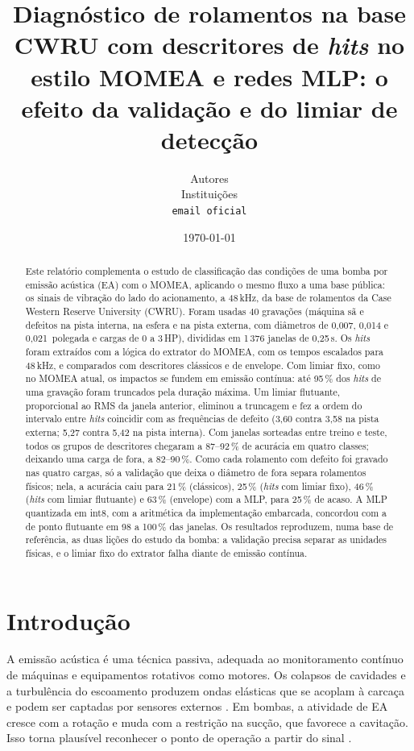 \documentclass[12pt]{article}
\title{\textbf{Diagnóstico de rolamentos na base CWRU com descritores de \textit{hits} no estilo MOMEA e redes MLP: o efeito da validação e do limiar de detecção}}
\date{\today}
\author{Autores \\ Instituições \\ \texttt{email oficial}}
\begin{document}
\maketitle

\begin{abstract}
Este relatório complementa o estudo de classificação das condições de uma bomba por emissão acústica (EA) com o MOMEA, aplicando o mesmo fluxo a uma base pública: os sinais de vibração do lado do acionamento, a 48\,kHz, da base de rolamentos da Case Western Reserve University (CWRU). Foram usadas 40 gravações (máquina sã e defeitos na pista interna, na esfera e na pista externa, com diâmetros de 0,007, 0,014 e 0,021~polegada e cargas de 0 a 3\,HP), divididas em 1\,376 janelas de 0,25\,s. Os \textit{hits} foram extraídos com a lógica do extrator do MOMEA, com os tempos escalados para 48\,kHz, e comparados com descritores clássicos e de envelope. Com limiar fixo, como no MOMEA atual, os impactos se fundem em emissão contínua: até 95\,\% dos \textit{hits} de uma gravação foram truncados pela duração máxima. Um limiar flutuante, proporcional ao RMS da janela anterior, eliminou a truncagem e fez a ordem do intervalo entre \textit{hits} coincidir com as frequências de defeito (3,60 contra 3,58 na pista externa; 5,27 contra 5,42 na pista interna). Com janelas sorteadas entre treino e teste, todos os grupos de descritores chegaram a 87--92\,\% de acurácia em quatro classes; deixando uma carga de fora, a 82--90\,\%. Como cada rolamento com defeito foi gravado nas quatro cargas, só a validação que deixa o diâmetro de fora separa rolamentos físicos; nela, a acurácia caiu para 21\,\% (clássicos), 25\,\% (\textit{hits} com limiar fixo), 46\,\% (\textit{hits} com limiar flutuante) e 63\,\% (envelope) com a MLP, para 25\,\% de acaso. A MLP quantizada em int8, com a aritmética da implementação embarcada, concordou com a de ponto flutuante em 98 a 100\,\% das janelas. Os resultados reproduzem, numa base de referência, as duas lições do estudo da bomba: a validação precisa separar as unidades físicas, e o limiar fixo do extrator falha diante de emissão contínua.
\end{abstract}

\section{Introdução}

A emissão acústica é uma técnica passiva, adequada ao monitoramento contínuo de máquinas e equipamentos rotativos como motores. Os colapsos de cavidades e a turbulência do escoamento produzem ondas elásticas que se acoplam à carcaça e podem ser captadas por sensores externos \cite{brennen1995,neill1997,alfayez2005}. Em bombas, a atividade de EA cresce com a rotação e muda com a restrição na sucção, que favorece a cavitação. Isso torna plausível reconhecer o ponto de operação a partir do sinal \cite{neill1997,alfayez2005,derakhshan1991}.
\end{document}
